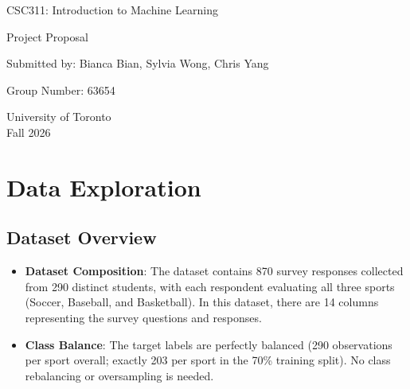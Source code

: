 \documentclass[12pt]{article}
\begin{document}
\begin{titlepage}
\centering
\vspace*{3cm}
{\Large {CSC311: Introduction to Machine Learning} \par}
\vspace{1cm}
{\Large {Project Proposal} \par}
\vspace{1cm}
\vspace{3cm}
{\large Submitted by: Bianca Bian, Sylvia Wong, Chris Yang \par}
{\large Group Number: 63654 \par}
\vspace{0.5cm}
\vfill
{\large University of Toronto \\ Fall 2026 \par}
\end{titlepage}
\clearpage
\setcounter{page}{1}

\section{Data Exploration}\label{sec:data-exploration}

\subsection*{Dataset Overview}
\begin{itemize}[leftmargin=1.5em]
    \item \textbf{Dataset Composition}: The dataset contains 870 survey responses collected from 290 distinct students, with each respondent evaluating all three sports (Soccer, Baseball, and Basketball). In this dataset, there are 14 columns representing the survey questions and responses.
    \item \textbf{Class Balance}: The target labels are perfectly balanced (290 observations per sport overall; exactly 203 per sport in the 70\% training split). No class rebalancing or oversampling is needed.
\end{itemize}
\end{document}
